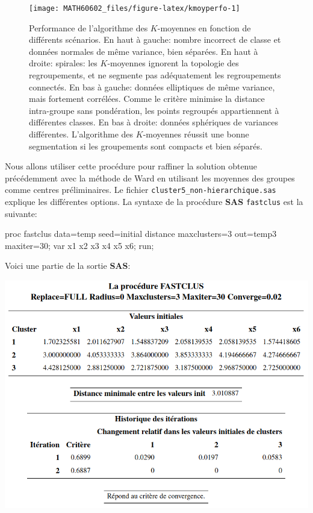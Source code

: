 \documentclass[
  11pt,
  letterpaper,
]{book}
\newenvironment{Shaded}{\begin{snugshade}}{\end{snugshade}}
\newcommand{\NormalTok}[1]{#1}
\theoremstyle{definition}
\theoremstyle{definition}
\theoremstyle{definition}
\theoremstyle{definition}
\theoremstyle{remark}
\begin{document}
\begin{figure}

{\centering \texttt{[image: MATH60602\_files/figure-latex/kmoyperfo-1]} 

}

\caption{Performance de l'algorithme des $K$-moyennes en fonction de différents scénarios. En haut à gauche: nombre incorrect de classe et données normales de même variance, bien séparées. En haut à droite: spirales: les $K$-moyennes ignorent la topologie des regroupements, et ne segmente pas adéquatement les regroupements connectés. En bas à gauche: données elliptiques de même variance, mais fortement corrélées. Comme le critère minimise la distance intra-groupe sans pondération, les points regroupés appartiennent à différentes classes. En bas à droite: données sphériques de variances différentes. L'algorithme des $K$-moyennes réussit une bonne segmentation si les groupements sont compacts et bien séparés.}\label{fig:kmoyperfo}
\end{figure}

Nous allons utiliser cette procédure pour raffiner la solution obtenue précédemment avec la méthode de Ward en utilisant les moyennes des groupes comme centres préliminaires. Le fichier \texttt{cluster5\_non-hierarchique.sas} explique les différentes options. La syntaxe de la procédure \textbf{SAS} \texttt{fastclus} est la suivante:

\begin{Shaded}
\begin{Highlighting}[]
\NormalTok{proc fastclus data=temp seed=initial distance maxclusters=3 out=temp3 maxiter=30;}
\NormalTok{var x1 x2 x3 x4 x5 x6;}
\NormalTok{run;}
\end{Highlighting}
\end{Shaded}

Voici une partie de la sortie \textbf{SAS}:

\begin{center}\includegraphics[width=0.7\linewidth]{figures/04-clustering-e14} \end{center}
\end{document}
